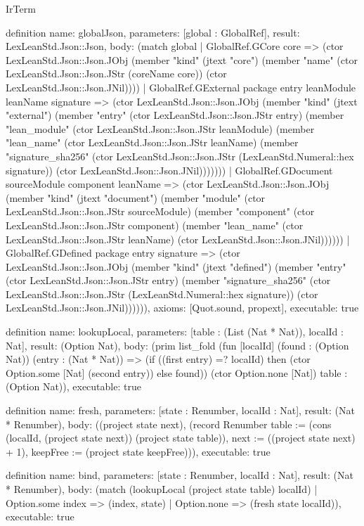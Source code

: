 \begin{lexlean}{IrTerm}
\begin{semanticmodule}
definition{
  name: globalJson,
  parameters: [global : GlobalRef],
  result: LexLeanStd.Json::Json,
  body: (match global
    | GlobalRef.GCore core => (ctor LexLeanStd.Json::Json.JObj (member "kind" (jtext "core") (member "name" (ctor LexLeanStd.Json::Json.JStr (coreName core)) (ctor LexLeanStd.Json::Json.JNil))))
    | GlobalRef.GExternal package entry leanModule leanName signature => (ctor LexLeanStd.Json::Json.JObj (member "kind" (jtext "external") (member "entry" (ctor LexLeanStd.Json::Json.JStr entry) (member "lean_module" (ctor LexLeanStd.Json::Json.JStr leanModule) (member "lean_name" (ctor LexLeanStd.Json::Json.JStr leanName) (member "signature_sha256" (ctor LexLeanStd.Json::Json.JStr (LexLeanStd.Numeral::hex signature)) (ctor LexLeanStd.Json::Json.JNil)))))))
    | GlobalRef.GDocument sourceModule component leanName => (ctor LexLeanStd.Json::Json.JObj (member "kind" (jtext "document") (member "module" (ctor LexLeanStd.Json::Json.JStr sourceModule) (member "component" (ctor LexLeanStd.Json::Json.JStr component) (member "lean_name" (ctor LexLeanStd.Json::Json.JStr leanName) (ctor LexLeanStd.Json::Json.JNil))))))
    | GlobalRef.GDefined package entry signature => (ctor LexLeanStd.Json::Json.JObj (member "kind" (jtext "defined") (member "entry" (ctor LexLeanStd.Json::Json.JStr entry) (member "signature_sha256" (ctor LexLeanStd.Json::Json.JStr (LexLeanStd.Numeral::hex signature)) (ctor LexLeanStd.Json::Json.JNil)))))),
  axioms: [Quot.sound, propext],
  executable: true
}

definition{
  name: lookupLocal,
  parameters: [table : (List (Nat * Nat)), localId : Nat],
  result: (Option Nat),
  body: (prim list_fold (fun [localId] (found : (Option Nat)) (entry : (Nat * Nat)) => (if ((first entry) =? localId) then (ctor Option.some [Nat] (second entry)) else found)) (ctor Option.none [Nat]) table : (Option Nat)),
  executable: true
}

definition{
  name: fresh,
  parameters: [state : Renumber, localId : Nat],
  result: (Nat * Renumber),
  body: ((project state next), (record Renumber {table := (cons (localId, (project state next)) (project state table)), next := ((project state next) + 1), keepFree := (project state keepFree)})),
  executable: true
}

definition{
  name: bind,
  parameters: [state : Renumber, localId : Nat],
  result: (Nat * Renumber),
  body: (match (lookupLocal (project state table) localId)
    | Option.some index => (index, state)
    | Option.none => (fresh state localId)),
  executable: true
}


\end{semanticmodule}
\end{lexlean}
